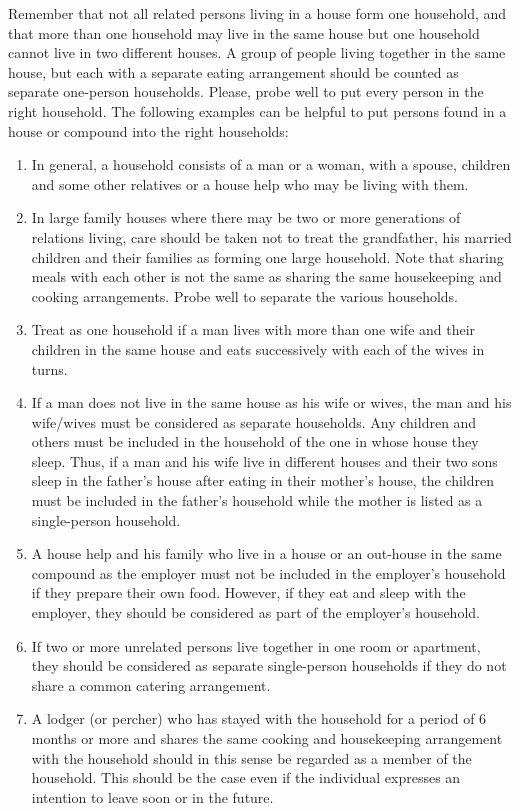 \documentclass[a4paper]{refart}
\begin{document}
Remember  that  not  all  related  persons  living  in  a  house  form  one  household,  and  that  more than one household may live in the same house but one household cannot live in two different houses. A group of people living together in the same house, but each with a separate eating arrangement should be counted as separate one-person households. Please, probe well to put every person in the right household. 
The following examples can be helpful to put persons found in a house or compound into the right households:
\begin{enumerate}
\item In general, a household consists of a man or a woman, with a spouse, children and some other relatives or a house help who may be living with them.
\item In large family houses where there may be two or more generations of relations living, care should be taken not to treat the grandfather, his married children and their families as forming one large household. Note that sharing meals with each other is not the same as sharing the same housekeeping and cooking arrangements. Probe well to separate the various households.
\item Treat as one household if a man lives with more than one wife and their children in the same house and eats successively with each of the wives in turns.
\item If a man does not live in the same house as his wife or wives, the man and his wife/wives must be considered as separate households. Any children and others must be included in the household of the one in whose house they sleep. Thus, if a man and his wife live in different houses and their two sons sleep in the father's house after eating in their mother's house, the children must be included in the father's household while the mother is listed as a single-person household.
\item A house help and his family who live in a house or an out-house in the same compound as the employer must not be included in the employer's household if they prepare their own food. However, if they eat and sleep with the employer, they should be considered as part of the employer's household.
\item If two or more unrelated persons live together in one room or apartment, they should be considered as separate single-person households if they do not share a common catering arrangement.
\item A lodger (or percher) who has stayed with the household for a period of 6 months or more and shares the same cooking and housekeeping arrangement with the household should in this sense be regarded as a member of the household. This should be the case even if the individual expresses an intention to leave soon or in the future.
\end{enumerate}
\end{document}
